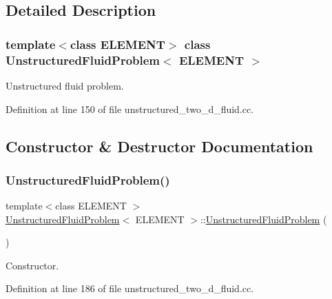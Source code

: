 \subsection{Detailed Description}
\subsubsection*{template$<$class E\+L\+E\+M\+E\+NT$>$\newline
class Unstructured\+Fluid\+Problem$<$ E\+L\+E\+M\+E\+N\+T $>$}

Unstructured fluid problem. 

Definition at line 150 of file unstructured\+\_\+two\+\_\+d\+\_\+fluid.\+cc.



\subsection{Constructor \& Destructor Documentation}
\mbox{\label{classUnstructuredFluidProblem_a9751f4afac540e148b3d90ae43dd5187}} 
\subsubsection{\texorpdfstring{Unstructured\+Fluid\+Problem()}{UnstructuredFluidProblem()}}
{\footnotesize\ttfamily template$<$class E\+L\+E\+M\+E\+NT $>$ \\
\hyperlink{classUnstructuredFluidProblem}{Unstructured\+Fluid\+Problem}$<$ E\+L\+E\+M\+E\+NT $>$\+::\hyperlink{classUnstructuredFluidProblem}{Unstructured\+Fluid\+Problem} (\begin{DoxyParamCaption}{ }\end{DoxyParamCaption})}



Constructor. 



Definition at line 186 of file unstructured\+\_\+two\+\_\+d\+\_\+fluid.\+cc.

\mbox{\label{classUnstructuredFluidProblem_a4d660faa6bae35197a4ea73139ac9963}} 
